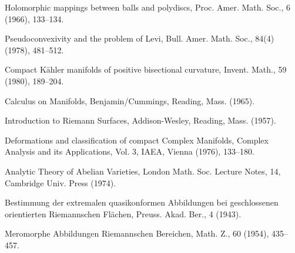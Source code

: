 \begin{sourcebibliography}
 Holomorphic mappings between balls and polydiscs, Proc. Amer. Math. Soc., 6 (1966), 133--134.
\end{sourcebibliography}
\begin{sourcebibliography}
 Pseudoconvexivity and the problem of Levi, Bull. Amer. Math. Soc., 84(4) (1978), 481--512.
\end{sourcebibliography}
\begin{sourcebibliography}
 Compact K\"ahler manifolds of positive bisectional curvature, Invent. Math., 59 (1980), 189--204.
\end{sourcebibliography}
\begin{sourcebibliography}
 Calculus on Manifolds, Benjamin/Cummings, Reading, Mass. (1965).
\end{sourcebibliography}
\begin{sourcebibliography}
 Introduction to Riemann Surfaces, Addison-Wesley, Reading, Mass. (1957).
\end{sourcebibliography}
\begin{sourcebibliography}
 Deformations and classification of compact Complex Manifolds, Complex Analysis and its Applications, Vol. 3, IAEA, Vienna (1976), 133--180.
\end{sourcebibliography}
\begin{sourcebibliography}
 Analytic Theory of Abelian Varieties, London Math. Soc. Lecture Notes, 14, Cambridge Univ. Press (1974).
\end{sourcebibliography}
\begin{sourcebibliography}
 Bestimmung der extremalen quasikonformen Abbildungen bei geschlossenen orientierten Riemannschen Fl\"achen, Preuss. Akad. Ber., 4 (1943).
\end{sourcebibliography}
\begin{sourcebibliography}
 Meromorphe Abbildungen Riemannschen Bereichen, Math. Z., 60 (1954), 435--457.
\end{sourcebibliography}
